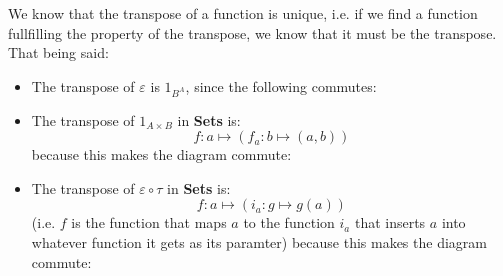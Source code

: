 \documentclass{scrartcl}
\begin{document}
    We know that the transpose of a function is unique, i.e. if we find a function fullfilling the property of the transpose, we know that it must be the transpose. That being said:
    
    \begin{itemize}
        \item The transpose of $ε$ is $1_{B^A}$, since the following commutes:
        
        \begin{figure}[H]\centering{}
    \end{figure}
    \item The transpose of $1_{A × B}$ in {\bf Sets} is:
    \[ f : a \mapsto (f_a : b \mapsto (a,b)) \] because this makes the diagram commute:
    \begin{figure}[H]\centering{}
    \end{figure}
    \item The transpose of $ε \circ τ$ in {\bf Sets} is:
    \[ f : a \mapsto (i_a : g \mapsto g(a)) \] (i.e. $f$ is the function that maps $a$ to the function $i_a$ that inserts $a$ into whatever function it gets as its paramter) because this makes the diagram commute:
    \begin{figure}[H]\centering{}
    \end{figure}
    \end{itemize}
\end{document}
